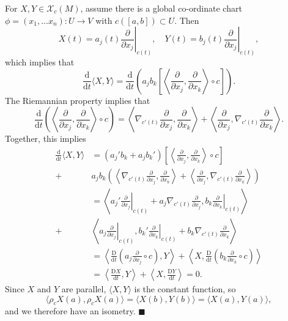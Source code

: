 \documentclass[letter-paper]{tufte-book}
\newenvironment{proof}[1][Proof]{\begin{trivlist}
\item[\hskip \labelsep {\bfseries #1}]}{\end{trivlist}}
\newcommand{\qed}{\hfill$\blacksquare$}
\begin{document}
\begin{proof}
  For $X,Y \in \mathcal{X}_c(M)$, assume there is a global co-ordinate chart $\phi = (x_1, \ldots x_n): U\to V$ with $c([a,b]) \subset U$. Then
  \begin{equation*}
    X(t) = a_j(t) \left.\frac{\partial}{\partial x_j}\right|_{c(t)}, \quad Y(t) = b_j(t) \left.\frac{\partial}{\partial x_j}\right|_{c(t)},
  \end{equation*}
  which implies that
  \begin{equation*}
    \frac{\mathrm{d}}{\mathrm{d}t} \langle X, Y\rangle = \frac{\mathrm{d}}{\mathrm{d}t} \left( a_j b_k \left[ \left\langle \frac{\partial}{\partial x_j}, \frac{\partial}{\partial x_k} \right\rangle \circ c \right] \right).
  \end{equation*}
  The Riemannian property implies that
  \begin{equation*}
    \frac{\mathrm{d}}{\mathrm{d}t} \left( \left\langle \frac{\partial}{\partial x_j}, \frac{\partial}{\partial x_k} \right\rangle \circ c \right) = \left\langle \nabla_{c'(t)}\frac{\partial}{\partial x_j}, \frac{\partial}{\partial x_k}  \right\rangle + \left\langle \frac{\partial}{\partial x_j}, \nabla_{c'(t)}\frac{\partial}{\partial x_k}  \right\rangle.
  \end{equation*}
  Together, this implies
  \begin{align*}
    \frac{\mathrm{d}}{\mathrm{d}t} \langle X, Y\rangle
      &= (a_j' b_k + a_j b_k') \left[ \left\langle \frac{\partial}{\partial x_j}, \frac{\partial}{\partial x_k} \right\rangle \circ c \right]\\
      +& a_j b_k \left(\left\langle \nabla_{c'(t)}\frac{\partial}{\partial x_j}, \frac{\partial}{\partial x_k}  \right\rangle + \left\langle \frac{\partial}{\partial x_j}, \nabla_{c'(t)}\frac{\partial}{\partial x_k}  \right\rangle\right)\\
      &= \left\langle a_j' \left.\frac{\partial}{\partial x_j}\right|_{c(t)} + a_j \nabla_{c'(t)} \frac{\partial}{\partial x_j}, b_k \left.\frac{\partial}{\partial x_k}\right|_{c(t)} \right\rangle\\
      +& \left\langle a_j \left.\frac{\partial}{\partial x_j}\right|_{c(t)}, b_k' \left.\frac{\partial}{\partial x_k}\right|_{c(t)} + b_k \nabla_{c'(t)}\frac{\partial}{\partial x_k} \right\rangle\\
      &= \left\langle \frac{\mathrm{D}}{\mathrm{d}t} \left(a_j \frac{\partial}{\partial x_j} \circ c\right), Y \right\rangle + \left\langle X, \frac{\mathrm{D}}{\mathrm{d}t} \left(b_k \frac{\partial}{\partial x_k} \circ c\right) \right\rangle\\
      &= \left\langle \frac{\mathrm{D}X}{\mathrm{d}t}, Y \right\rangle + \left\langle X, \frac{\mathrm{D}Y}{\mathrm{d}t} \right\rangle = 0.
  \end{align*}
  Since $X$ and $Y$ are parallel, $\langle X, Y\rangle$ is the constant function, so
  \begin{equation*}
    \langle \rho_c X(a), \rho_c X(a) \rangle = \langle X(b), Y(b)\rangle = \langle X(a), Y(a) \rangle,
  \end{equation*}
  and we therefore have an isometry. \qed
\end{proof}
\end{document}
